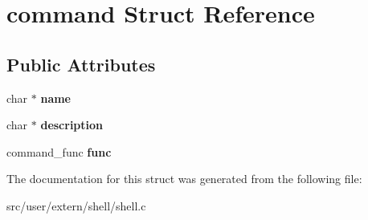 \hypertarget{structcommand}{}\section{command Struct Reference}
\label{structcommand}
\subsection*{Public Attributes}
\begin{DoxyCompactItemize}
\item 
\mbox{\label{structcommand_abba3287ede24847a4de869fd64cd071a}} 
char $\ast$ {\bfseries name}
\item 
\mbox{\label{structcommand_ad4f32fab1b9eb1b11276cc192d1bfbe6}} 
char $\ast$ {\bfseries description}
\item 
\mbox{\label{structcommand_a514efdcb37d87a70c8044c3742639bbc}} 
command\+\_\+func {\bfseries func}
\end{DoxyCompactItemize}


The documentation for this struct was generated from the following file\+:\begin{DoxyCompactItemize}
\item 
src/user/extern/shell/shell.\+c\end{DoxyCompactItemize}
